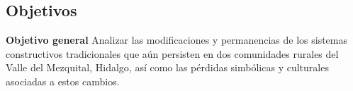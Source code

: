 \subsection{Objetivos}






\textbf{Objetivo general}
Analizar las modificaciones y permanencias de los sistemas constructivos tradicionales que aún persisten en dos comunidades rurales del Valle del Mezquital, Hidalgo, así como las pérdidas simbólicas y culturales asociadas a estos cambios.

